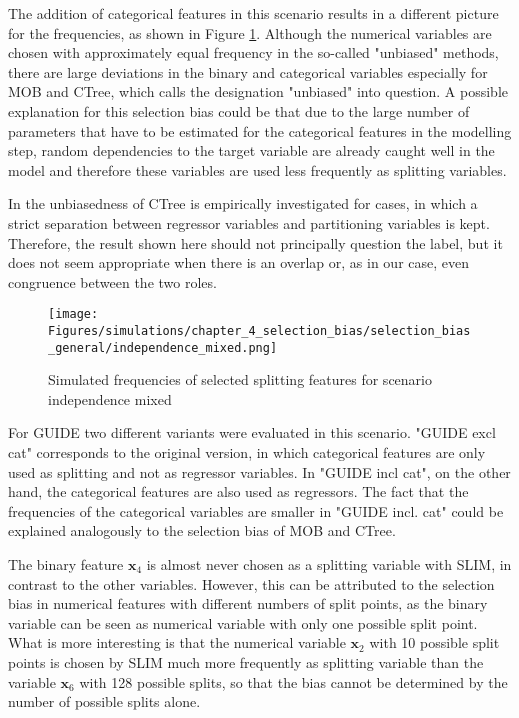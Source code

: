 The addition of categorical features in this scenario results in a different picture for the frequencies, as shown in Figure \ref{fig:selection_bias_independence_mixed}. Although the numerical variables are chosen with approximately equal frequency in the so-called "unbiased" methods, there are large deviations in the binary and categorical variables especially for MOB and CTree, which calls the designation "unbiased" into question. 
A possible explanation for this selection bias could be that due to the large number of parameters that have to be estimated for the categorical features in the modelling step, random dependencies to the target variable are already caught well in the model  and therefore these variables are used less frequently as splitting variables.


In \citep{Hothorn.2006} the unbiasedness of CTree is empirically investigated for cases, in which a strict separation between regressor variables and partitioning variables is kept. Therefore, the result shown here should not principally question the label, but it does not seem appropriate when there is an overlap or, as in our case, even congruence between the two roles.


\begin{figure}[!htb]
    \centering
    \texttt{[image: Figures/simulations/chapter\_4\_selection\_bias/selection\_bias\_general/independence\_mixed.png]}
    \caption{Simulated frequencies of selected splitting features for scenario independence mixed}
    \label{fig:selection_bias_independence_mixed}
\end{figure}

For GUIDE two different variants were evaluated in this scenario. "GUIDE excl cat" corresponds to the original version, in which categorical features are only used as splitting and not as regressor variables. In "GUIDE incl cat", on the other hand, the categorical features are also used as regressors. The fact that the frequencies of the categorical variables are smaller in "GUIDE incl. cat" could be explained analogously to the selection bias of MOB and CTree.

The binary feature $\textbf{x}_4$ is almost never chosen as a splitting variable with SLIM, in contrast to the other variables. However, this can be attributed to the selection bias in numerical features with different numbers of split points, as the binary variable can be seen as numerical variable with only one possible split point. What is more interesting is that the numerical variable $\textbf{x}_2$ with 10 possible split points is chosen by SLIM much more frequently as splitting variable than the variable $\textbf{x}_6$ with 128 possible splits, so that the bias cannot be determined by the number of possible splits alone.

